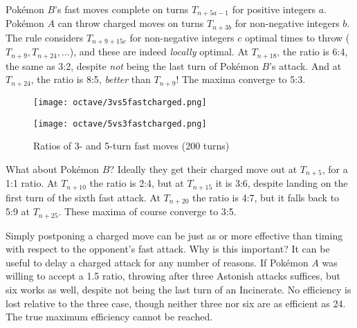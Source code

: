 Pokémon $B$'s fast moves complete on turns $T_{n+5a-1}$ for positive integers $a$.
Pokémon $A$ can throw charged moves on turns $T_{n+3b}$ for non-negative integers $b$.
The rule considers $T_{n+9+15c}$ for non-negative integers $c$ optimal times to throw
 ($T_{n+9}, T_{n+24}, \dots$), and these are indeed \textit{locally} optimal.
At $T_{n+18}$, the ratio is 6:4, the same as 3:2, despite \textit{not} being the last turn of Pokémon $B$'s attack.
And at $T_{n+24}$, the ratio is 8:5, \textit{better} than $T_{n+9}$!
The maxima converge to 5:3.

\begin{figure}
\begin{minipage}{0.5\textwidth}\centering
\texttt{[image: octave/3vs5fastcharged.png]}
\end{minipage}
\begin{minipage}{0.5\textwidth}\centering
\texttt{[image: octave/5vs3fastcharged.png]}
\end{minipage}
\caption{Ratios of 3- and 5-turn fast moves (200 turns)\label{figure:35ratios}}
\end{figure}

What about Pokémon $B$\@?
Ideally they get their charged move out at $T_{n+5}$, for a 1:1 ratio.
At $T_{n+10}$ the ratio is 2:4, but at $T_{n+15}$ it is 3:6, despite landing on the first turn of the sixth fast attack.
At $T_{n+20}$ the ratio is 4:7, but it falls back to 5:9 at $T_{n+25}$.
These maxima of course converge to 3:5.

Simply postponing a charged move can be just as or more effective than timing with
  respect to the opponent's fast attack.
Why is this important?
It can be useful to delay a charged attack for any number of reasons.
If Pokémon $A$ was willing to accept a 1.5 ratio, throwing after three Astonish
  attacks suffices, but six works as well, despite not being the last turn of an Incinerate.
No efficiency is lost relative to the three case, though neither three nor six are as
  efficient as 24.
The true maximum efficiency cannot be reached.


